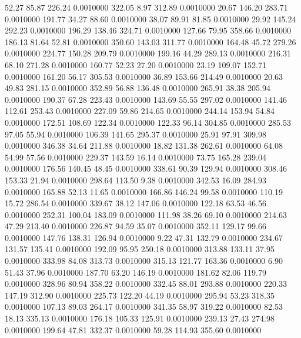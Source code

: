   52.27   85.87  226.24   0.0010000
 322.05    8.97  312.89   0.0010000
  20.67  146.20  283.71   0.0010000
 191.77   34.27   88.60   0.0010000
  38.07   89.91   81.85   0.0010000
  29.92  145.24  292.23   0.0010000
 196.29  138.46  324.71   0.0010000
 127.66   79.95  358.66   0.0010000
 186.13   81.64   52.81   0.0010000
 350.60  143.03  311.77   0.0010000
 164.48   45.72  279.26   0.0010000
 224.77  150.28  209.79   0.0010000
 199.16   44.29  289.13   0.0010000
 216.31   68.10  271.28   0.0010000
 160.77   52.23   27.20   0.0010000
  23.19  109.07  152.71   0.0010000
 161.20   56.17  305.53   0.0010000
  36.89  153.66  214.49   0.0010000
  20.63   49.83  281.15   0.0010000
 352.89   56.88  136.48   0.0010000
 265.91   38.38  205.94   0.0010000
 190.37   67.28  223.43   0.0010000
 143.69   55.55  297.02   0.0010000
 141.46  112.61  253.43   0.0010000
 227.09   59.86  214.65   0.0010000
 244.14  153.94   54.84   0.0010000
 172.51  108.69  122.34   0.0010000
 122.33   96.14  304.85   0.0010000
 285.53   97.05   55.94   0.0010000
 106.39  141.65  295.37   0.0010000
  25.91   97.91  309.98   0.0010000
 346.38   34.64  211.88   0.0010000
  18.82  131.38  262.61   0.0010000
  64.08   54.99   57.56   0.0010000
 229.37  143.59   16.14   0.0010000
  73.75  165.28  239.04   0.0010000
 176.56  140.45   48.45   0.0010000
 338.61   90.39  129.94   0.0010000
 308.46  153.33   21.94   0.0010000
 298.64  113.50    9.38   0.0010000
 342.53   16.09  284.93   0.0010000
 165.88   52.13   11.65   0.0010000
 166.86  146.24   99.58   0.0010000
 110.19   15.72  286.54   0.0010000
 339.67   38.12  147.06   0.0010000
 122.18   63.53   46.56   0.0010000
 252.31  100.04  183.09   0.0010000
 111.98   38.26   69.10   0.0010000
 214.63   47.29  213.40   0.0010000
 226.87   94.59   35.07   0.0010000
 352.11  129.17   99.66   0.0010000
 147.76  138.31  126.94   0.0010000
   9.22   47.31  132.79   0.0010000
 234.67  131.57  135.41   0.0010000
 192.09   95.95  250.18   0.0010000
 313.88  133.11   37.95   0.0010000
 333.98   84.08  313.73   0.0010000
 315.13  121.77  163.36   0.0010000
   6.90   51.43   37.96   0.0010000
 187.70   63.20  146.19   0.0010000
 181.62   82.06  119.79   0.0010000
 328.96   80.94  358.22   0.0010000
 332.45   88.01  293.88   0.0010000
 220.33  147.19  312.90   0.0010000
 225.73  122.20   44.19   0.0010000
 295.94   53.23  318.35   0.0010000
 107.13   89.03  264.17   0.0010000
 341.35   58.97  319.22   0.0010000
  82.53   18.13  335.13   0.0010000
 176.18  105.33  125.91   0.0010000
 239.13   27.43  274.98   0.0010000
 199.64   47.81  332.37   0.0010000
  59.28  114.93  355.60   0.0010000

